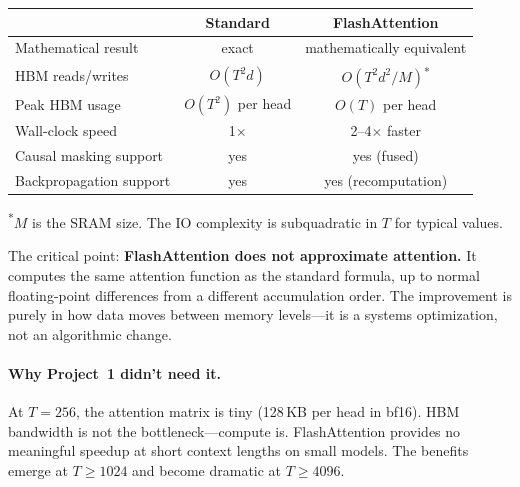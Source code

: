 \begin{center}
\begin{tabular}{lcc}
\toprule
 & \textbf{Standard} & \textbf{FlashAttention} \\
\midrule
Mathematical result        & exact & mathematically equivalent \\
HBM reads/writes           & $O(T^2 d)$ & $O(T^2 d^2 / M)$\textsuperscript{*} \\
Peak HBM usage             & $O(T^2)$ per head & $O(T)$ per head \\
Wall-clock speed            & 1$\times$ & 2--4$\times$ faster \\
Causal masking support      & yes & yes (fused) \\
Backpropagation support     & yes & yes (recomputation) \\
\bottomrule
\end{tabular}
\end{center}

\noindent\textsuperscript{*}$M$ is the SRAM size. The IO complexity is subquadratic in $T$ for typical values.

\medskip

The critical point: \textbf{FlashAttention does not approximate attention.} It computes the same attention function as the standard formula, up to normal floating-point differences from a different accumulation order. The improvement is purely in how data moves between memory levels---it is a systems optimization, not an algorithmic change.

\medskip
\noindent{}
\medskip

\paragraph{Why Project~1 didn't need it.} At $T = 256$, the attention matrix is tiny (128\,KB per head in bf16). HBM bandwidth is not the bottleneck---compute is. FlashAttention provides no meaningful speedup at short context lengths on small models. The benefits emerge at $T \geq 1024$ and become dramatic at $T \geq 4096$.

